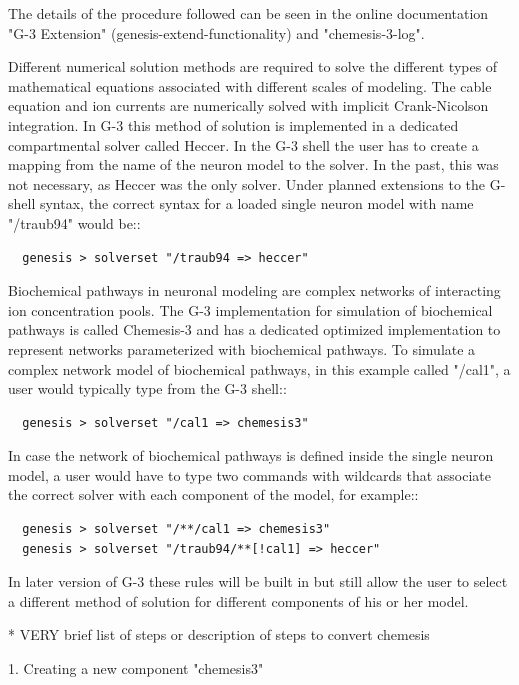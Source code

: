 \documentclass[12pt]{article}
\begin{document}
The details of the procedure followed can be seen in the online
documentation "G-3 Extension" (genesis-extend-functionality) and
"chemesis-3-log".


Different numerical solution methods are required to solve the different
types of mathematical equations associated with different scales of
modeling.  The cable equation and ion currents are numerically solved with
implicit Crank-Nicolson integration.  In G-3 this method of solution is
implemented in a dedicated compartmental solver called Heccer.  In the G-3
shell the user has to create a mapping from the name of the neuron model to
the solver.  In the past, this was not necessary, as Heccer was the only
solver.  Under planned extensions to the G-shell syntax, the correct syntax
for a loaded single neuron model with name "/traub94" would be::

\begin{verbatim}
  genesis > solverset "/traub94 => heccer"
\end{verbatim}

Biochemical pathways in neuronal modeling are complex networks of
interacting ion concentration pools.  The G-3 implementation for
simulation of biochemical pathways is called Chemesis-3 and has a
dedicated optimized implementation to represent networks parameterized
with biochemical pathways.  To simulate a complex network model of
biochemical pathways, in this example called "/cal1", a user would
typically type from the G-3 shell::

\begin{verbatim}
  genesis > solverset "/cal1 => chemesis3"
\end{verbatim}

In case the network of biochemical pathways is defined inside the
single neuron model, a user would have to type two commands with
wildcards that associate the correct solver with each component of the
model, for example::

\begin{verbatim}
  genesis > solverset "/**/cal1 => chemesis3"
  genesis > solverset "/traub94/**[!cal1] => heccer"
\end{verbatim}

In later version of G-3 these rules will be built in but still allow
the user to select a different method of solution for different
components of his or her model.


* VERY brief list of steps or description of steps to convert chemesis

  1. Creating a new component "chemesis3"
\end{document}
